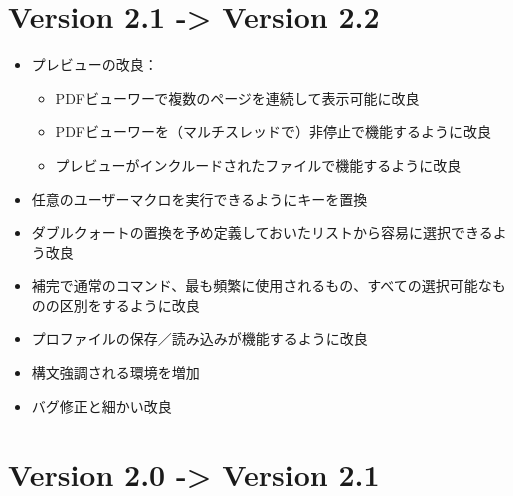 \section{Version 2.1 -\textgreater{} Version 2.2}

\begin{itemize}
\item
  プレビューの改良：

  \begin{itemize}
  \item
    PDFビューワーで複数のページを連続して表示可能に改良
  \item
    PDFビューワーを（マルチスレッドで）非停止で機能するように改良
  \item
    プレビューがインクルードされたファイルで機能するように改良
  \end{itemize}
\item
  任意のユーザーマクロを実行できるようにキーを置換
\item
  ダブルクォートの置換を予め定義しておいたリストから容易に選択できるよう改良
\item
  補完で通常のコマンド、最も頻繁に使用されるもの、すべての選択可能なものの区別をするように改良
\item
  プロファイルの保存／読み込みが機能するように改良
\item
  構文強調される環境を増加
\item
  バグ修正と細かい改良
\end{itemize}

\section{Version 2.0 -\textgreater{} Version 2.1}

